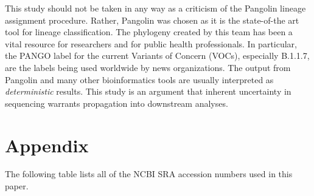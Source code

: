 \documentclass[10pt]{article}
\begin{document}
This study should not be taken in any way as a criticism of the Pangolin lineage assignment procedure.
Rather, Pangolin was chosen as it is the state-of-the art tool for lineage classification.
The phylogeny created by this team has been a vital resource for researchers and for public health professionals.
In particular, the PANGO label for the current Variants of Concern (VOCs), especially B.1.1.7, are the labels being used worldwide by news organizations.
The output from Pangolin and many other bioinformatics tools are usually interpreted as \emph{deterministic} results.
This study is an argument that inherent uncertainty in sequencing warrants propagation into downstream analyses.



\section*{Appendix}

The following table lists all of the NCBI SRA accession numbers used in this paper.
\end{document}
